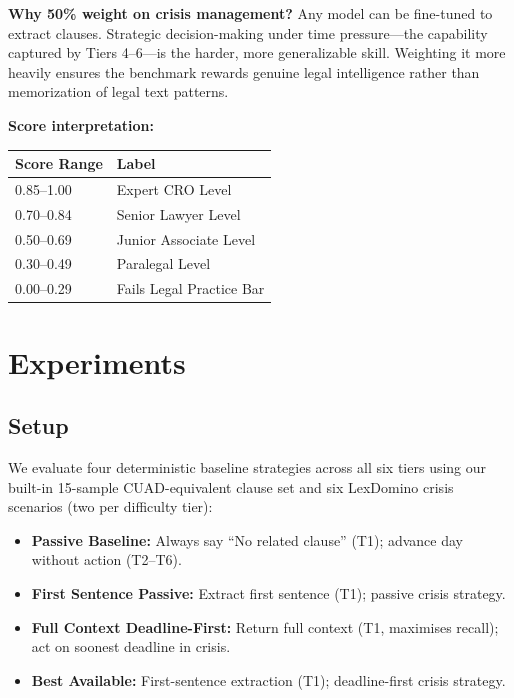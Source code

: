 \documentclass[11pt]{article}
\begin{document}
\textbf{Why 50\% weight on crisis management?} Any model can be fine-tuned to extract clauses. Strategic decision-making under time pressure---the capability captured by Tiers 4--6---is the harder, more generalizable skill. Weighting it more heavily ensures the benchmark rewards genuine legal intelligence rather than memorization of legal text patterns.

\textbf{Score interpretation:}
\begin{center}
\begin{tabular}{ll}
\toprule
\textbf{Score Range} & \textbf{Label} \\
\midrule
0.85--1.00 & Expert CRO Level \\
0.70--0.84 & Senior Lawyer Level \\
0.50--0.69 & Junior Associate Level \\
0.30--0.49 & Paralegal Level \\
0.00--0.29 & Fails Legal Practice Bar \\
\bottomrule
\end{tabular}
\end{center}

\section{Experiments}

\subsection{Setup}

We evaluate four deterministic baseline strategies across all six tiers using our built-in 15-sample CUAD-equivalent clause set and six LexDomino crisis scenarios (two per difficulty tier):

\begin{itemize}
  \item \textbf{Passive Baseline:} Always say ``No related clause'' (T1); advance day without action (T2--T6).
  \item \textbf{First Sentence Passive:} Extract first sentence (T1); passive crisis strategy.
  \item \textbf{Full Context Deadline-First:} Return full context (T1, maximises recall); act on soonest deadline in crisis.
  \item \textbf{Best Available:} First-sentence extraction (T1); deadline-first crisis strategy.
\end{itemize}
\end{document}
